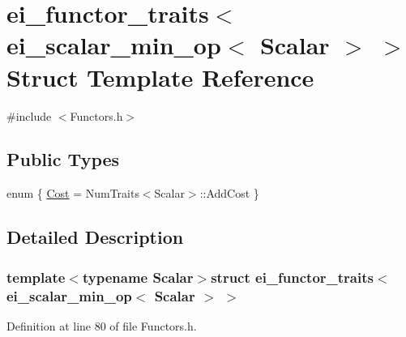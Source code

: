 \hypertarget{structei__functor__traits_3_01ei__scalar__min__op_3_01_scalar_01_4_01_4}{\section{ei\-\_\-functor\-\_\-traits$<$ ei\-\_\-scalar\-\_\-min\-\_\-op$<$ Scalar $>$ $>$ Struct Template Reference}
\label{structei__functor__traits_3_01ei__scalar__min__op_3_01_scalar_01_4_01_4}
}


{\ttfamily \#include $<$Functors.\-h$>$}

\subsection*{Public Types}
\begin{DoxyCompactItemize}
\item 
enum \{ \hyperlink{structei__functor__traits_3_01ei__scalar__min__op_3_01_scalar_01_4_01_4_a030f44e4446e5a1c87794b44701c6a10a5c61e010465c368ffe4924a35c922685}{Cost} = Num\-Traits$<$Scalar$>$\-:\-:Add\-Cost
 \}
\end{DoxyCompactItemize}


\subsection{Detailed Description}
\subsubsection*{template$<$typename Scalar$>$struct ei\-\_\-functor\-\_\-traits$<$ ei\-\_\-scalar\-\_\-min\-\_\-op$<$ Scalar $>$ $>$}



Definition at line 80 of file Functors.\-h.



